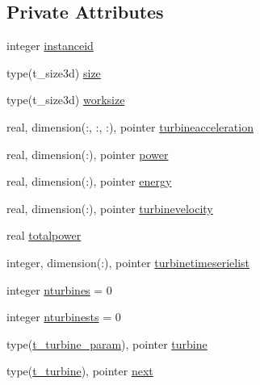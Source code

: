 \subsection*{Private Attributes}
\begin{DoxyCompactItemize}
\item 
integer \mbox{\hyperlink{structmoduleturbine_1_1t__turbine_a1161393ae163aa532155fd870a4410df}{instanceid}}
\item 
type(t\+\_\+size3d) \mbox{\hyperlink{structmoduleturbine_1_1t__turbine_a3254282ee285eb1ecdf61321a37717c0}{size}}
\item 
type(t\+\_\+size3d) \mbox{\hyperlink{structmoduleturbine_1_1t__turbine_a6059588b2893e21ed0385e3c4974c62a}{worksize}}
\item 
real, dimension(\+:, \+:, \+:), pointer \mbox{\hyperlink{structmoduleturbine_1_1t__turbine_aff602110ef54775715f875aaa5a9041e}{turbineacceleration}}
\item 
real, dimension(\+:), pointer \mbox{\hyperlink{structmoduleturbine_1_1t__turbine_af21ad178f80d9ac63627c0396ac267ad}{power}}
\item 
real, dimension(\+:), pointer \mbox{\hyperlink{structmoduleturbine_1_1t__turbine_aff0a034e42c0a9427d855d706e5f7ea4}{energy}}
\item 
real, dimension(\+:), pointer \mbox{\hyperlink{structmoduleturbine_1_1t__turbine_a301b046c3643018178d9ae58ec52af7a}{turbinevelocity}}
\item 
real \mbox{\hyperlink{structmoduleturbine_1_1t__turbine_abce99daf95471789cc4e64a84317b242}{totalpower}}
\item 
integer, dimension(\+:), pointer \mbox{\hyperlink{structmoduleturbine_1_1t__turbine_af425b317d4ed8020c08214d2c7838019}{turbinetimeserielist}}
\item 
integer \mbox{\hyperlink{structmoduleturbine_1_1t__turbine_a3e1327e26fff7fc0a9a090ba20c8d8ff}{nturbines}} = 0
\item 
integer \mbox{\hyperlink{structmoduleturbine_1_1t__turbine_a9be8b3e5f434b005cd735b47684e3d4e}{nturbinests}} = 0
\item 
type(\mbox{\hyperlink{structmoduleturbine_1_1t__turbine__param}{t\+\_\+turbine\+\_\+param}}), pointer \mbox{\hyperlink{structmoduleturbine_1_1t__turbine_a91405bb207b6e469e0d21d62cdbeab66}{turbine}}
\item 
type(\mbox{\hyperlink{structmoduleturbine_1_1t__turbine}{t\+\_\+turbine}}), pointer \mbox{\hyperlink{structmoduleturbine_1_1t__turbine_a12f3ba2fdde75e05346cb284e2975532}{next}}
\item 

\end{DoxyCompactItemize}
